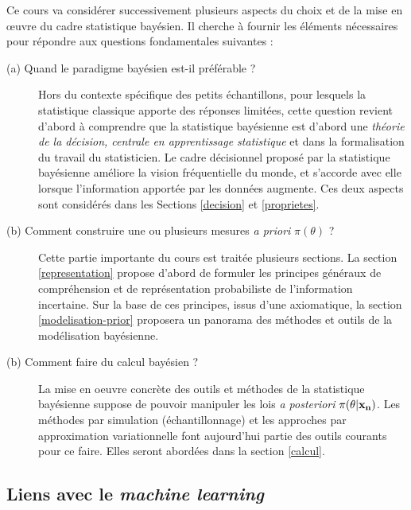 Ce cours va considérer successivement plusieurs aspects du choix et de la mise en {\oe}uvre du cadre statistique bayésien. Il cherche à fournir les éléments nécessaires pour répondre aux questions fondamentales suivantes :
\begin{description}
\item[(a) Quand le paradigme bayésien est-il préférable ?] Hors du contexte spécifique des petits échantillons, pour lesquels la statistique classique apporte des réponses limitées, cette question revient d'abord à comprendre que la statistique bayésienne est d'abord une \emph{théorie de la décision, centrale en apprentissage statistique} et dans la formalisation du travail du statisticien. Le cadre décisionnel proposé par la statistique bayésienne améliore la vision fréquentielle du monde, et s'accorde avec elle lorsque l'information apportée par les données augmente. Ces deux aspects sont considérés dans les Sections \ref{decision} et \ref{proprietes}. 
\item[(b) Comment construire une ou plusieurs mesures {\it a priori} $\pi(\theta)$ ?] Cette partie importante du cours est traitée plusieurs sections. La section \ref{representation} propose d'abord de formuler les principes généraux de compréhension et de représentation probabiliste de l'information incertaine. Sur la base de ces principes, issus d'une axiomatique, la section \ref{modelisation-prior} proposera un panorama des méthodes et outils de la modélisation bayésienne. 
\item[(b) Comment faire du calcul bayésien ?] La mise en oeuvre concrète des outils et méthodes de la statistique bayésienne suppose de pouvoir manipuler les lois {\it a posteriori} $\pi(\theta|{\bf x_n})$. Les méthodes par simulation (échantillonnage) et les approches par approximation variationnelle font aujourd'hui partie des outils courants pour ce faire. Elles seront abordées dans la section \ref{calcul}.  
\end{description}







\subsection{Liens avec le \emph{machine learning}}\label{estimation.MAP.ML}

